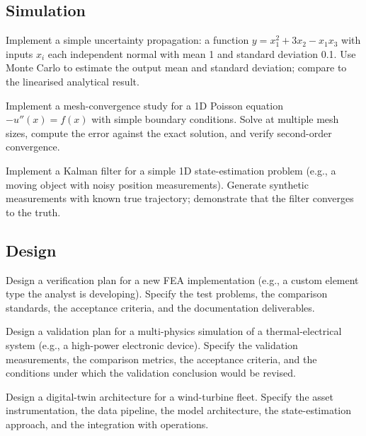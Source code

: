 \subsection*{Simulation}

\begin{exercise}
Implement a simple uncertainty propagation: a function $y = x_1^2 + 3 x_2 - x_1 x_3$ with inputs $x_i$ each independent normal with mean 1 and standard deviation 0.1. Use Monte Carlo to estimate the output mean and standard deviation; compare to the linearised analytical result.
\end{exercise}

\begin{exercise}
Implement a mesh-convergence study for a 1D Poisson equation $-u''(x) = f(x)$ with simple boundary conditions. Solve at multiple mesh sizes, compute the error against the exact solution, and verify second-order convergence.
\end{exercise}

\begin{exercise}
Implement a Kalman filter for a simple 1D state-estimation problem (e.g., a moving object with noisy position measurements). Generate synthetic measurements with known true trajectory; demonstrate that the filter converges to the truth.
\end{exercise}

\subsection*{Design}

\begin{exercise}
Design a verification plan for a new FEA implementation (e.g., a custom element type the analyst is developing). Specify the test problems, the comparison standards, the acceptance criteria, and the documentation deliverables.
\end{exercise}

\begin{exercise}
Design a validation plan for a multi-physics simulation of a thermal-electrical system (e.g., a high-power electronic device). Specify the validation measurements, the comparison metrics, the acceptance criteria, and the conditions under which the validation conclusion would be revised.
\end{exercise}

\begin{exercise}
Design a digital-twin architecture for a wind-turbine fleet. Specify the asset instrumentation, the data pipeline, the model architecture, the state-estimation approach, and the integration with operations.
\end{exercise}

